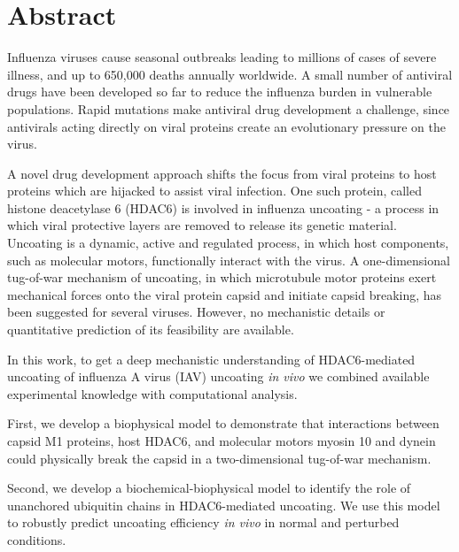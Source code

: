 \begingroup
\let\clearpage\relax
\let\cleardoublepage\relax
\let\cleardoublepage\relax

\chapter*{Abstract}

Influenza viruses cause seasonal outbreaks leading to millions of cases of severe illness, and up to 650,000 deaths annually worldwide. A small number of antiviral drugs have been developed so far to reduce the influenza burden in vulnerable populations. Rapid mutations make antiviral drug development a challenge, since antivirals acting directly on viral proteins create an evolutionary pressure on the virus.

A novel drug development approach shifts the focus from viral proteins to host proteins which are hijacked to assist viral infection. One such protein, called histone deacetylase 6 (HDAC6) is involved in influenza uncoating - a process in which viral protective layers are removed to release its genetic material. Uncoating is a dynamic, active and regulated process, in which host components, such as molecular motors, functionally interact with the virus. A one-dimensional tug-of-war mechanism of uncoating, in which microtubule motor proteins exert mechanical forces onto the viral protein capsid and initiate capsid breaking, has been suggested for several viruses. However, no mechanistic details or quantitative prediction of its feasibility are available.

In this work, to get a deep mechanistic understanding of HDAC6-mediated uncoating of influenza A virus (IAV) uncoating \textit{in vivo} we combined available experimental knowledge with computational analysis.

First, we develop a biophysical model to demonstrate that interactions between capsid M1 proteins, host HDAC6, and molecular motors myosin 10 and dynein could physically break the capsid in a two-dimensional tug-of-war mechanism.

Second, we develop a biochemical-biophysical model to identify the role of unanchored ubiquitin chains in HDAC6-mediated uncoating. We use this model to robustly predict uncoating efficiency \textit{in vivo} in normal and perturbed conditions.

